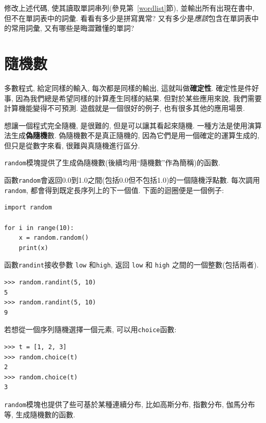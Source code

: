 \documentclass[10pt]{book}
\begin{document}
\begin{exercise}

修改上述代碼, 使其讀取單詞串列(參見第~\ref{wordlist}節), 
並輸出所有出現在書中, 但不在單詞表中的詞彙. 
看看有多少是拼寫異常? 又有多少是{\em 應該}包含在單詞表中的常用詞彙,
又有哪些是晦澀難懂的單詞?

\end{exercise}


\section{隨機數}

多數程式, 給定同樣的輸入, 每次都是同樣的輸出, 這就叫做{\bf 確定性}.
確定性是件好事, 因為我們總是希望同樣的計算產生同樣的結果. 
但對於某些應用來說, 我們需要計算機能變得不可預測. 
遊戲就是一個很好的例子, 也有很多其他的應用場景. 

想讓一個程式完全隨機, 是很難的, 但是可以讓其看起來隨機. 
一種方法是使用演算法生成{\bf 偽隨機}數.
偽隨機數不是真正隨機的, 因為它們是用一個確定的運算生成的, 
但只是從數字來看, 很難與真隨機進行區分. 

{\tt random}模塊提供了生成偽隨機數(後續均用``隨機數''作為簡稱)的函數.

函數{\tt random}會返回0.0到1.0之間(包括0.0但不包括1.0)的一個隨機浮點數. 
每次調用{\tt random}, 都會得到既定長序列上的下一個值. 
下面的迴圈便是一個例子:

\begin{verbatim}
import random

for i in range(10):
    x = random.random()
    print(x)
\end{verbatim}
%
函數{\tt randint}接收參數 {\tt low} 和{\tt high}, 
返回 {\tt low} 和 {\tt high} 之間的一個整數(包括兩者). 

\begin{verbatim}
>>> random.randint(5, 10)
5
>>> random.randint(5, 10)
9
\end{verbatim}
%
若想從一個序列隨機選擇一個元素, 可以用{\tt choice}函數:

\begin{verbatim}
>>> t = [1, 2, 3]
>>> random.choice(t)
2
>>> random.choice(t)
3
\end{verbatim}
%
{\tt random}模塊也提供了些可基於某種連續分布, 
比如高斯分布, 指數分布, 伽馬分布等, 生成隨機數的函數. 
\end{document}
